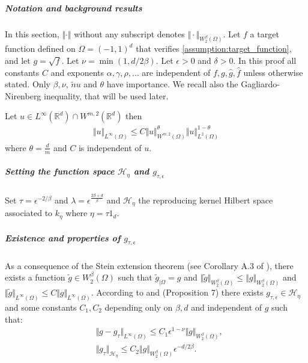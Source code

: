 \subparagraph{Notation and background results} In this section, $\Vert \cdot \Vert$ without any subscript denotes $\Vert \cdot\Vert_{W_2^\beta(\Omega)}$. Let $f$ a target function defined on $\Omega = (-1, 1)^d$ that verifies \cref{assumption:target_function}, and let $g = \sqrt{f}$. Let $\nu = \min(1, d/2\beta)$. Let $\epsilon > 0$ and $\delta > 0$. In this proof all constants $C$ and exponents $\alpha, \gamma, \rho, \ldots$ are independent of $f, g, \hat g, \hat f$ unless otherwise stated. Only $\beta, \nu$, $\tilde nu$ and $\theta$ have importance. We recall also the Gagliardo-Nirenberg inequality, that will be used later.
\begin{lemma}\label{lemma:gargliano}
Let $u\in L^\infty(\mathbb R^d)\cap W^{m, 2}(\mathbb R^d)$ then
    \begin{align}
        \Vert u \Vert_{L^\infty(\Omega)} \leq C \Vert u\Vert_{W^{m, 2}(\Omega)}^\theta \Vert u\Vert_{L^2(\Omega)}^{1-\theta}
    \end{align}
    where $\theta = \frac{d}{m}$ and $C$ is independent of $u$.
\end{lemma}


\subparagraph{Setting the function space $\mathcal H_\eta$ and $g_{\tau, \epsilon}$}
Set $\tau = \epsilon^{-2/\beta}$ and $\lambda = \epsilon^{\frac{2\beta + d}{\beta}}$ and $\mathcal H_\eta$ the reproducing kernel Hilbert space associated to $k_\eta$ where $\eta = \tau 1_d$.

\subparagraph{Existence and properties of $g_{\tau, \epsilon}$}
As a consequence of the Stein extension theorem (see Corollary A.3 of \cite{ciliberto2021}), there exists a function $\tilde g \in W^\beta_2(\Omega)$ such that $\tilde g_{\vert \Omega}=g$ and $\Vert \tilde g\Vert_{W_2^\beta(\Omega)} \leq\Vert g\Vert_{W_2^\beta(\Omega)}$ and $\Vert \tilde g\Vert_{L^\infty(\Omega)}\leq C\Vert g\Vert_{L^\infty(\Omega)}$.
%
According to \cite{ciliberto2021} and \cite{sampling-ulysse} (Proposition 7) there exists $g_{\tau, \epsilon}\in\mathcal H_\eta$ and some constants $C_1, C_2$ depending only on $\beta, d$ and independent of $g$ such that:
\begin{align}
&\Vert g - g_\tau \Vert_{L^\infty(\Omega)} \leq C_1 \epsilon^{1- \nu}\Vert g\Vert_{W^\beta_2(\Omega)}\label{eq:g-g-tau},\\
&\Vert g_\tau \Vert_{\mathcal H_\eta}\leq C_2 \Vert g\Vert_{W^\beta_2(\Omega)}\epsilon^{-d/2\beta}\label{eq:g-tau}.
\end{align}

